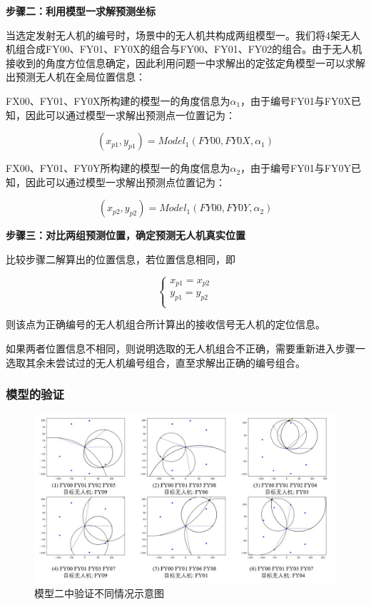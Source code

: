 \documentclass{my_paper}
\begin{document}
\textbf{步骤二：利用模型一求解预测坐标}

当选定发射无人机的编号时，场景中的无人机共构成两组模型一。我们将4架无人机组合成FY00、FY01、FY0X的组合与FY00、FY01、FY02的组合。由于无人机接收到的角度方位信息确定，因此利用问题一中求解出的定弦定角模型一可以求解出预测无人机在全局位置信息：

FX00、FY01、FY0X所构建的模型一的角度信息为$\alpha_1$，由于编号FY01与FY0X已知，因此可以通过模型一求解出预测点一位置记为：

\begin{equation}
    (x_{p1}, y_{p1}) = Model_1(FY00, FY0X, \alpha_1)
\end{equation}

FX00、FY01、FY0Y所构建的模型一的角度信息为$\alpha_2$，由于编号FY01与FY0Y已知，因此可以通过模型一求解出预测点位置记为：

\begin{equation}
    (x_{p2}, y_{p2}) = Model_1(FY00, FY0Y, \alpha_2)
\end{equation}

\textbf{步骤三：对比两组预测位置，确定预测无人机真实位置}

比较步骤二解算出的位置信息，若位置信息相同，即

\begin{equation}
    \begin{cases}
        x_{p1} = x_{p2}\\
        y_{p1} = y_{p2}\\
    \end{cases}
\end{equation}

则该点为正确编号的无人机组合所计算出的接收信号无人机的定位信息。

如果两者位置信息不相同，则说明选取的无人机组合不正确，需要重新进入步骤一选取其余未尝试过的无人机编号组合，直至求解出正确的编号组合。\\

\subsubsection{模型的验证}

\begin{figure}[h]
    \centering
    \includegraphics[width=1\textwidth]{images/duoqingkuang.jpg}
    \caption{模型二中验证不同情况示意图}
    \label{duoqingkuang}
\end{figure}
\end{document}
